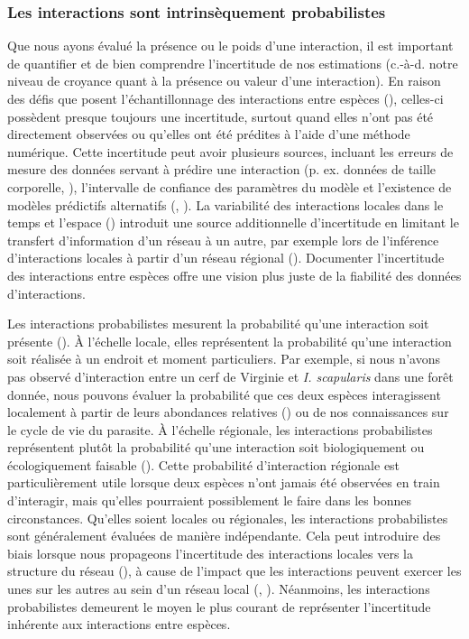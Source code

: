 \subsubsection{Les interactions sont intrinsèquement probabilistes} 

Que nous ayons évalué la présence ou le poids d'une interaction, il est
important de quantifier et de bien comprendre l'incertitude de nos estimations
(c.-à-d. notre niveau de croyance quant à la présence ou valeur d'une
interaction). En raison des défis que posent l'échantillonnage des interactions
entre espèces (\cite{Jordano2016Sampling}), celles-ci possèdent presque toujours
une incertitude, surtout quand elles n'ont pas été directement observées ou
qu'elles ont été prédites à l'aide d'une méthode numérique. Cette incertitude
peut avoir plusieurs sources, incluant les erreurs de mesure des données servant
à prédire une interaction (p. ex. données de taille corporelle,
\cite{Gravel2013Inferring}), l'intervalle de confiance des paramètres du modèle
et l'existence de modèles prédictifs alternatifs (\cite{Simmonds2022Insights},
\cite{Simmonds2024Recommendations}). La variabilité des interactions locales
dans le temps et l'espace (\cite{Poisot2015Species}) introduit une source
additionnelle d'incertitude en limitant le transfert d'information d'un réseau à
un autre, par exemple lors de l'inférence d'interactions locales à partir d'un
réseau régional (\cite{Dansereau2023Spatially}). Documenter l'incertitude des
interactions entre espèces offre une vision plus juste de la fiabilité des
données d'interactions. 

Les interactions probabilistes mesurent la probabilité qu'une interaction soit
présente (\cite{Poisot2016Structure}). À l'échelle locale, elles représentent la
probabilité qu'une interaction soit réalisée à un endroit et moment
particuliers. Par exemple, si nous n'avons pas observé d'interaction entre un
cerf de Virginie et \textit{I. scapularis} dans une forêt donnée, nous pouvons
évaluer la probabilité que ces deux espèces interagissent localement à partir de
leurs abondances relatives (\cite{Canard2014Empirical}) ou de nos connaissances
sur le cycle de vie du parasite. À l'échelle régionale, les interactions
probabilistes représentent plutôt la probabilité qu'une interaction soit
biologiquement ou écologiquement faisable (\cite{Strydom2023Grapha}). Cette
probabilité d'interaction régionale est particulièrement utile lorsque deux
espèces n'ont jamais été observées en train d'interagir, mais qu'elles
pourraient possiblement le faire dans les bonnes circonstances. Qu'elles soient
locales ou régionales, les interactions probabilistes sont généralement évaluées
de manière indépendante. Cela peut introduire des biais lorsque nous propageons
l'incertitude des interactions locales vers la structure du réseau
(\cite{Poisot2016Structure}), à cause de l'impact que les interactions peuvent
exercer les unes sur les autres au sein d'un réseau local
(\cite{Golubski2011Modifying}, \cite{Ims2013Indirect}). Néanmoins, les
interactions probabilistes demeurent le moyen le plus courant de représenter
l'incertitude inhérente aux interactions entre espèces.


